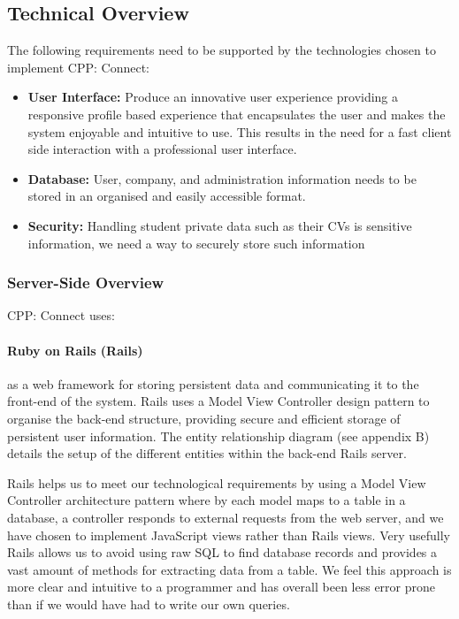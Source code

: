 \subsection{Technical Overview}
	The following requirements need to be supported by the technologies chosen to implement CPP: Connect:
		\begin{itemize}
		  \item \textbf{User Interface:} Produce an innovative user experience providing a responsive profile based experience that encapsulates the user and makes the system enjoyable and intuitive to use. This results in the need for a fast client side interaction with a professional user interface.
		  \item \textbf{Database:} User, company, and administration information needs to be stored in an organised and easily accessible format.
		  \item \textbf{Security:} Handling student private data such as their CVs is sensitive information, we need a way to securely store such information 
		\end{itemize} 

	\subsubsection{Server-Side Overview}
		CPP: Connect uses:
		\paragraph{Ruby on Rails (Rails)\cite{ror}} as a web framework for storing persistent data and communicating it to the front-end of the system. Rails uses a Model View Controller design pattern to organise the back-end structure, providing secure and efficient storage of persistent user information. The entity relationship diagram (see appendix B) details the setup of the different entities within the back-end Rails server.

		Rails helps us to meet our technological requirements by using a Model View Controller architecture pattern where by each model maps to a table in a database, a controller responds to external requests from the web server, and we have chosen to implement JavaScript views rather than Rails views.
		Very usefully Rails allows us to avoid using raw SQL to find database records and provides a vast amount of methods for extracting data from a table. We feel this approach is more clear and intuitive to a programmer and has overall been less error prone than if we would have had to write our own queries.

